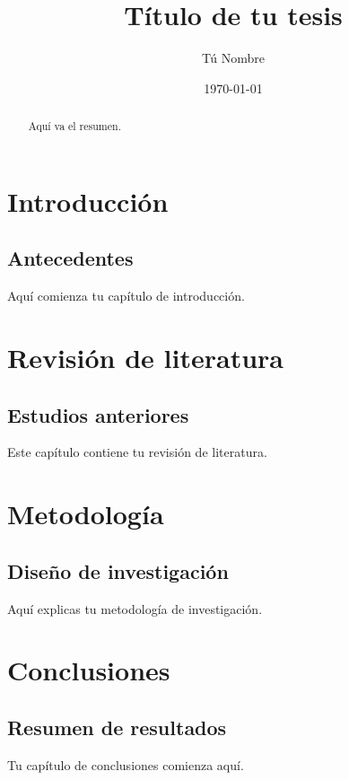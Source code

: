 \documentclass{report}
\begin{document}
\title{Título de tu tesis}
\author{Tú Nombre}
\date{\today}
\maketitle

\begin{abstract}
  Aquí va el resumen.
\end{abstract}

\tableofcontents

\chapter{Introducción}
\section{Antecedentes}
Aquí comienza tu capítulo de introducción.

\chapter{Revisión de literatura}
\section{Estudios anteriores}
Este capítulo contiene tu revisión de literatura.

\chapter{Metodología}
\section{Diseño de investigación}
Aquí explicas tu metodología de investigación.


\chapter{Conclusiones}
\section{Resumen de resultados}
Tu capítulo de conclusiones comienza aquí.

\begin{thebibliography}{}
\end{thebibliography}
\end{document}
